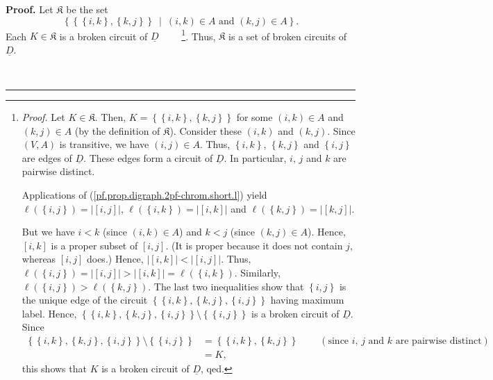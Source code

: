 \documentclass[numbers=enddot,12pt,final,onecolumn,notitlepage]{scrartcl}%
\theoremstyle{definition}
\newenvironment{proof}[1][Proof]{\noindent\textbf{#1.} }{\ \rule{0.5em}{0.5em}}
\newenvironment{vershort}{}{}
\begin{document}
\begin{vershort}
\begin{proof}
Let $\mathfrak{K}$ be the set
\[
\left\{  \left\{  \left\{  i,k\right\}  ,\left\{  k,j\right\}  \right\}
\ \mid\ \left(  i,k\right)  \in A\text{ and }\left(  k,j\right)  \in
A\right\}  .
\]
Each $K\in\mathfrak{K}$ is a broken circuit of $\underline{D}$%
\ \ \ \ \footnote{\textit{Proof.} Let $K\in\mathfrak{K}$. Then, $K=\left\{
\left\{  i,k\right\}  ,\left\{  k,j\right\}  \right\}  $ for some $\left(
i,k\right)  \in A$ and $\left(  k,j\right)  \in A$ (by the definition of
$\mathfrak{K}$). Consider these $\left(  i,k\right)  $ and $\left(
k,j\right)  $. Since $\left(  V,A\right)  $ is transitive, we have $\left(
i,j\right)  \in A$. Thus, $\left\{  i,k\right\}  $, $\left\{  k,j\right\}  $
and $\left\{  i,j\right\}  $ are edges of $\underline{D}$. These edges form a
circuit of $\underline{D}$. In particular, $i$, $j$ and $k$ are pairwise
distinct.
\par
Applications of (\ref{pf.prop.digraph.2pf-chrom.short.l}) yield $\ell\left(
\left\{  i,j\right\}  \right)  =\left\vert \left[  i,j\right]  \right\vert $,
$\ell\left(  \left\{  i,k\right\}  \right)  =\left\vert \left[  i,k\right]
\right\vert $ and $\ell\left(  \left\{  k,j\right\}  \right)  =\left\vert
\left[  k,j\right]  \right\vert $.
\par
But we have $i<k$ (since $\left(  i,k\right)  \in A$) and $k<j$ (since
$\left(  k,j\right)  \in A$). Hence, $\left[  i,k\right]  $ is a proper subset
of $\left[  i,j\right]  $. (It is proper because it does not contain $j$,
whereas $\left[  i,j\right]  $ does.) Hence, $\left\vert \left[  i,k\right]
\right\vert <\left\vert \left[  i,j\right]  \right\vert $. Thus, $\ell\left(
\left\{  i,j\right\}  \right)  =\left\vert \left[  i,j\right]  \right\vert
>\left\vert \left[  i,k\right]  \right\vert =\ell\left(  \left\{  i,k\right\}
\right)  $. Similarly, $\ell\left(  \left\{  i,j\right\}  \right)
>\ell\left(  \left\{  k,j\right\}  \right)  $. The last two inequalities show
that $\left\{  i,j\right\}  $ is the unique edge of the circuit $\left\{
\left\{  i,k\right\}  ,\left\{  k,j\right\}  ,\left\{  i,j\right\}  \right\}
$ having maximum label. Hence, $\left\{  \left\{  i,k\right\}  ,\left\{
k,j\right\}  ,\left\{  i,j\right\}  \right\}  \setminus\left\{  \left\{
i,j\right\}  \right\}  $ is a broken circuit of $\underline{D}$. Since%
\begin{align*}
\left\{  \left\{  i,k\right\}  ,\left\{  k,j\right\}  ,\left\{  i,j\right\}
\right\}  \setminus\left\{  \left\{  i,j\right\}  \right\}   &  =\left\{
\left\{  i,k\right\}  ,\left\{  k,j\right\}  \right\}
\ \ \ \ \ \ \ \ \ \ \left(  \text{since }i\text{, }j\text{ and }k\text{ are
pairwise distinct}\right) \\
&  =K,
\end{align*}
this shows that $K$ is a broken circuit of $\underline{D}$, qed.}. Thus,
$\mathfrak{K}$ is a set of broken circuits of $\underline{D}$.


\end{proof}
\end{vershort}
\end{document}
